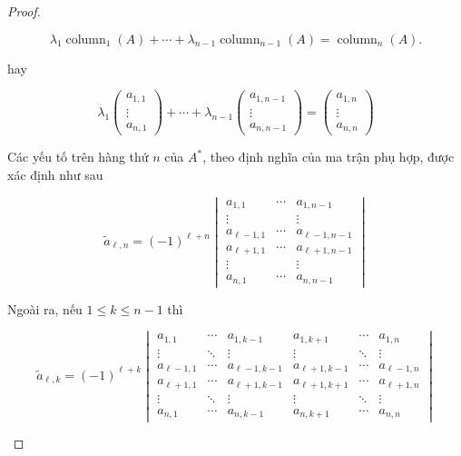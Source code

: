 \begin{proof}
\begin{enumerate}[label = \textbf{Trường hợp \arabic*.},itemindent=2cm]
              \[ \lambda_{1}\operatorname{column}_{1}(A) + \cdots + \lambda_{n-1}\operatorname{column}_{n-1}(A) = \operatorname{column}_{n}(A). \]

              hay

              \[\lambda_{1}\begin{pmatrix}a_{1,1}\\ \vdots \\ a_{n,1} \end{pmatrix} + \cdots + \lambda_{n-1}\begin{pmatrix}a_{1,n-1}\\ \vdots \\ a_{n,n-1} \end{pmatrix} = \begin{pmatrix}a_{1,n}\\ \vdots \\ a_{n,n} \end{pmatrix}\]

              Các yếu tố trên hàng thứ $n$ của $A^{*}$, theo định nghĩa của ma trận phụ hợp, được xác định như sau

              \[\tilde{a}_{\ell, n} = {(-1)}^{\ell + n} \begin{vmatrix} a_{1,1}      & \cdots & a_{1,n-1}      \\ \vdots &  & \vdots \\ a_{\ell-1,1} & \cdots & a_{\ell-1,n-1} \\
                a_{\ell+1,1} & \cdots & a_{\ell+1,n-1} \\ \vdots & & \vdots \\ a_{n,1} & \cdots & a_{n,n-1}\end{vmatrix}\]

              Ngoài ra, nếu $1\leq k\leq n-1$ thì

              \[\tilde{a}_{\ell, k} = {(-1)}^{\ell + k} \begin{vmatrix} a_{1,1} & \cdots & a_{1,k-1} & a_{1,k+1} & \cdots & a_{1,n} \\ \vdots & \ddots & \vdots & \vdots & \ddots & \vdots \\ a_{\ell - 1,1} & \cdots & a_{\ell-1,k-1} & a_{\ell+1,k-1} & \cdots & a_{\ell-1,n} \\ a_{\ell+1,1} & \cdots & a_{\ell+1,k-1} & a_{\ell+1,k+1} & \cdots & a_{\ell+1,n} \\ \vdots & \ddots & \vdots & \vdots & \ddots & \vdots \\ a_{n,1} & \cdots & a_{n,k-1} & a_{n,k+1} & \cdots & a_{n,n} \end{vmatrix}\]


\end{enumerate}
\end{proof}
